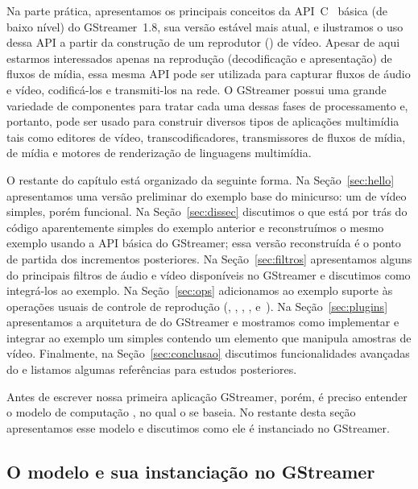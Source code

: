 \documentclass{SBCbookchapter}
\begin{document}
Na parte prática, apresentamos os principais conceitos da
API~C~\cite{Kernighan-B-W-1988} básica (de baixo nível) do GStreamer~1.8,
sua versão estável mais atual, e ilustramos o uso dessa API a partir da
construção de um reprodutor () de vídeo.  Apesar de aqui estarmos
interessados apenas na reprodução (decodificação e apresentação) de fluxos
de mídia, essa mesma API pode ser utilizada para capturar fluxos de áudio e
vídeo, codificá-los e transmiti-los na rede.  O GStreamer possui uma grande
variedade de componentes para tratar cada uma dessas fases de processamento
e, portanto, pode ser usado para construir diversos tipos de aplicações
multimídia tais como editores de vídeo, transcodificadores, transmissores de
fluxos de mídia,  de mídia e motores de renderização de
linguagens multimídia.

O restante do capítulo está organizado da seguinte forma.  Na
Seção~\ref{sec:hello} apresentamos uma versão preliminar do exemplo base do
minicurso: um  de vídeo simples, porém funcional.  Na
Seção~\ref{sec:dissec} discutimos o que está por trás do código
aparentemente simples do exemplo anterior e reconstruímos o mesmo exemplo
usando a API básica do GStreamer; essa versão reconstruída é o ponto de
partida dos incrementos posteriores.  Na Seção~\ref{sec:filtros}
apresentamos alguns do principais filtros de áudio e vídeo disponíveis no
GStreamer e discutimos como integrá-los ao exemplo.  Na Seção~\ref{sec:ops}
adicionamos ao exemplo suporte às operações usuais de controle de reprodução
(, , , , 
e~).  Na Seção~\ref{sec:plugins} apresentamos a arquitetura de
 do GStreamer e mostramos como implementar e integrar ao exemplo
um  simples contendo um elemento que manipula amostras de vídeo.
Finalmente, na Seção~\ref{sec:conclusao} discutimos funcionalidades
avançadas do  e listamos algumas referências para estudos
posteriores.

Antes de escrever nossa primeira aplicação GStreamer, porém, é preciso
entender o modelo de computação , no qual o  se
baseia.  No restante desta seção apresentamos esse modelo e discutimos como
ele é instanciado no GStreamer.


\clearpage
\subsection*{O modelo  e sua instanciação no GStreamer}
\end{document}
